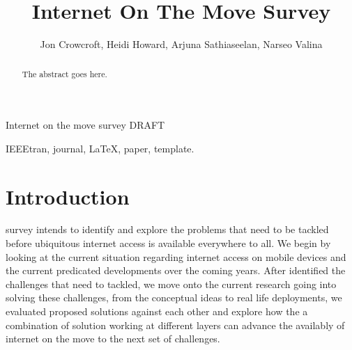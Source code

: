 \documentclass[journal]{IEEEtran}
\begin{document}
\title{Internet On The Move Survey}



\author{Jon Crowcroft, Heidi Howard, Arjuna Sathiaseelan, Narseo Valina} %
        

%
{Internet on the move survey DRAFT}

\maketitle


\begin{abstract}
The abstract goes here.
\end{abstract}


\begin{IEEEkeywords}
IEEEtran, journal, \LaTeX, paper, template.
\end{IEEEkeywords}



\section{Introduction}
 survey intends to identify and explore the problems that need to be tackled before ubiquitous internet access is available everywhere to all. We begin by looking at the current situation regarding internet access on mobile devices and the current predicated developments over the coming years. After identified the challenges that need to tackled, we move onto the current research going into solving these challenges, from the conceptual ideas to real life deployments, we evaluated proposed solutions against each other and explore how the a combination of solution working at different layers can advance the availably of internet on the move to the next set of challenges. 
\end{document}
